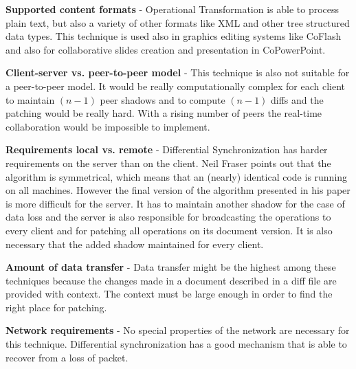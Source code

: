 \documentclass[12pt,oneside]{fithesis2}
\begin{document}
\vspace{3mm}
\newpage
\textbf{Supported content formats} - Operational Transformation is able to process plain text, but also a variety of other formats like XML and other tree structured data types. This technique is used also in graphics editing systems \cite{graphics} like CoFlash and also for collaborative slides creation and presentation in CoPowerPoint.

\vspace{3mm}

\par \textbf{\underline{}}

\vspace{3mm}

\textbf{Client-server vs. peer-to-peer model} - This technique is also not suitable for a peer-to-peer model. It would be really computationally complex for each client to maintain \((n-1)\) peer shadows and to compute \((n-1)\) diffs and the patching would be really hard. With a rising number of peers the real-time collaboration would be impossible to implement.

\vspace{3mm}

\textbf{Requirements local vs. remote} - Differential Synchronization has harder requirements on the server than on the client. Neil Fraser \cite{Fraser} points out that the algorithm is symmetrical, which means that an (nearly) identical code is running on all machines. However the final version of the algorithm presented in his paper is more difficult for the server. It has to maintain another shadow for the case of data loss and the server is also responsible for broadcasting the operations to every client and for patching all operations on its document version. It is also necessary that the added shadow maintained for every client.

\vspace{3mm}

\textbf{Amount of data transfer} - Data transfer might be the highest among these techniques because the changes made in a document described in a diff file are provided with context. The context must be large enough in order to find the right place for patching.

\vspace{3mm}

\textbf{Network requirements} - No special properties of the network are necessary for this technique. Differential synchronization has a good mechanism that is able to recover from a loss of packet.
\end{document}
